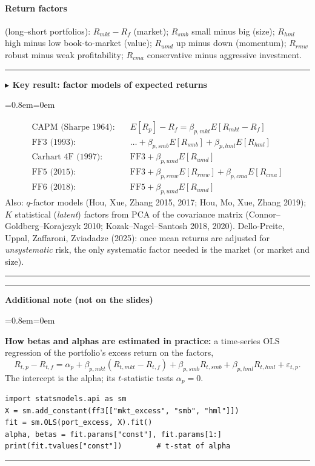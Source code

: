\documentclass[11pt,a4paper]{report}
\newenvironment{notebox}[1]
  {\par\medskip\Needspace{6\baselineskip}\noindent\rule{\linewidth}{0.4pt}\par\nopagebreak
   \noindent\textbf{#1}\par\nopagebreak
   \begin{list}{}{\leftmargin=0.8em\rightmargin=0em\topsep=2pt}\item[]}
  {\end{list}\nopagebreak\noindent\rule{\linewidth}{0.4pt}\par\medskip}
\newenvironment{keybox}[1][]{\begin{notebox}{$\blacktriangleright$ Key result#1}}{\end{notebox}}
\newenvironment{addnote}{\begin{notebox}{Additional note (not on the slides)}}{\end{notebox}}
\begin{document}
\paragraph{Return factors} (long--short portfolios):
$R_{mkt}-R_f$ (market); $R_{smb}$ small minus big (size); $R_{hml}$ high minus low
book-to-market (value); $R_{umd}$ up minus down (momentum); $R_{rmw}$ robust
minus weak profitability; $R_{cma}$ conservative minus aggressive investment.

\begin{keybox}[: factor models of expected returns]
\begin{align*}
\text{CAPM (Sharpe 1964):}\quad & E[R_p]-R_f=\beta_{p,mkt}E[R_{mkt}-R_f]\\
\text{FF3 (1993):}\quad & \ldots+\beta_{p,smb}E[R_{smb}]+\beta_{p,hml}E[R_{hml}]\\
\text{Carhart 4F (1997):}\quad & \text{FF3}+\beta_{p,umd}E[R_{umd}]\\
\text{FF5 (2015):}\quad & \text{FF3}+\beta_{p,rmw}E[R_{rmw}]+\beta_{p,cma}E[R_{cma}]\\
\text{FF6 (2018):}\quad & \text{FF5}+\beta_{p,umd}E[R_{umd}]
\end{align*}
Also: $q$-factor models (Hou, Xue, Zhang 2015, 2017; Hou, Mo, Xue, Zhang 2019);
$K$ statistical (\emph{latent}) factors from PCA of the covariance matrix
(Connor--Goldberg--Korajczyk 2010; Kozak--Nagel--Santosh 2018, 2020).
Dello-Preite, Uppal, Zaffaroni, Zviadadze (2025): once mean returns are adjusted
for \emph{unsystematic} risk, the only systematic factor needed is the market
(or market and size).
\end{keybox}

\begin{addnote}
\textbf{How betas and alphas are estimated in practice:} a time-series OLS
regression of the portfolio's excess return on the factors,
\[
R_{t,p}-R_{t,f}=\alpha_p+\beta_{p,mkt}(R_{t,mkt}-R_{t,f})+\beta_{p,smb}R_{t,smb}+\beta_{p,hml}R_{t,hml}+\varepsilon_{t,p}.
\]
The intercept is the alpha; its $t$-statistic tests $\alpha_p=0$.
\begin{lstlisting}
import statsmodels.api as sm
X = sm.add_constant(ff3[["mkt_excess", "smb", "hml"]])
fit = sm.OLS(port_excess, X).fit()
alpha, betas = fit.params["const"], fit.params[1:]
print(fit.tvalues["const"])        # t-stat of alpha
\end{lstlisting}
\end{addnote}
\end{document}
